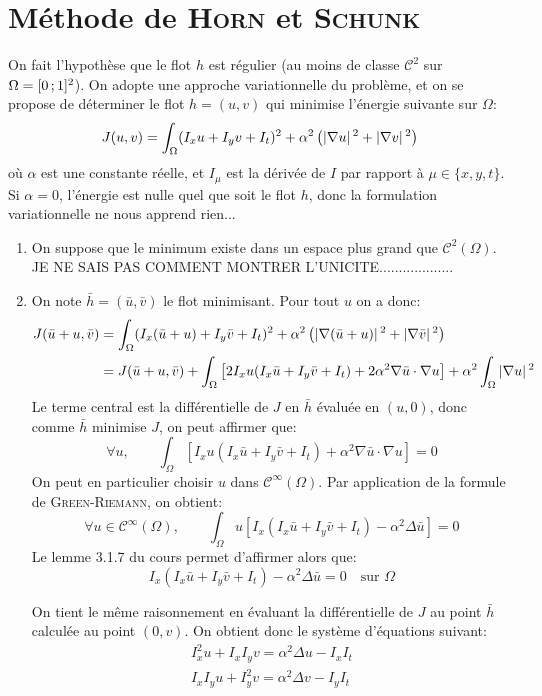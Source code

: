 \section{Méthode de \textsc{Horn} et \textsc{Schunk}}

On fait l'hypothèse que le flot $h$ est régulier (au moins de classe $\mathscr{C}^2$ sur $\Omega = \interff{0}{1}^2$). On adopte une approche variationnelle du problème, et on se propose de déterminer le flot $h = (u,v)$ qui minimise l'énergie suivante sur $\Omega$:
\[ J(u,v) = \int_{\Omega} (I_xu + I_yv + I_t)^2 + \alpha^2\left( \abs{\nabla u}^2 + \abs{\nabla v}^2 \right) \]
où $\alpha$ est une constante réelle, et $I_\mu$ est la dérivée de $I$ par rapport à $\mu \in \lbrace x, y, t \rbrace$.\\
Si $\alpha = 0$, l'énergie est nulle quel que soit le flot $h$, donc la formulation variationnelle ne nous apprend rien...

\begin{enumerate}[questions]
\item On suppose que le minimum existe dans un espace plus grand que $\mathscr{C}^2(\Omega)$. \\
JE NE SAIS PAS COMMENT MONTRER L'UNICITE...................

\item On note $\bar{h} = (\bar{u}, \bar{v})$ le flot minimisant. Pour tout $u$ on a donc:
\begin{align*}
J(\bar{u}+u, \bar{v}) &= \int_{\Omega} (I_x(\bar{u}+u) + I_y\bar{v} + I_t)^2 + \alpha^2\left( \abs{\nabla (\bar{u}+u)}^2 + \abs{\nabla \bar{v}}^2 \right) \\
&= J(\bar{u}+u, \bar{v}) + \int_\Omega \left[2 I_x u(I_x\bar{u} + I_y\bar{v} + I_t) + 2\alpha^2 \nabla\bar{u} \cdot \nabla u\right] + \alpha^2 \int_\Omega \abs{\nabla u}^2
\end{align*}
Le terme central est la différentielle de $J$ en $\bar{h}$ évaluée en $(u, 0)$, donc comme $\bar{h}$ minimise $J$, on peut affirmer que:
\[ \forall u, \qquad \int_\Omega \left[I_x u(I_x\bar{u} + I_y\bar{v} + I_t) + \alpha^2 \nabla\bar{u} \cdot \nabla u\right] = 0 \]
On peut en particulier choisir $u$ dans $\mathscr{C}^\infty(\Omega)$. Par application de la formule de \textsc{Green-Riemann}, on obtient:
\[ \forall u \in \mathscr{C}^\infty(\Omega), \qquad \int_\Omega u\left[I_x(I_x\bar{u} + I_y\bar{v} + I_t) - \alpha^2 \Delta\bar{u} \right] = 0 \]
Le lemme 3.1.7 du cours permet d'affirmer alors que:
\[ I_x(I_x\bar{u} + I_y\bar{v} + I_t) - \alpha^2 \Delta\bar{u} = 0 \quad \text{sur } \Omega \]

On tient le même raisonnement en évaluant la différentielle de $J$ au point $\bar{h}$ calculée au point $(0, v)$. On obtient donc le système d'équations suivant:
\begin{gather}
I_x^2 u + I_xI_y v = \alpha^2 \Delta u - I_xI_t \label{eq:uDomin} \\
I_xI_y u + I_y^2 v = \alpha^2 \Delta v - I_yI_t \label{eq:vDomin}
\end{gather}
\end{enumerate}